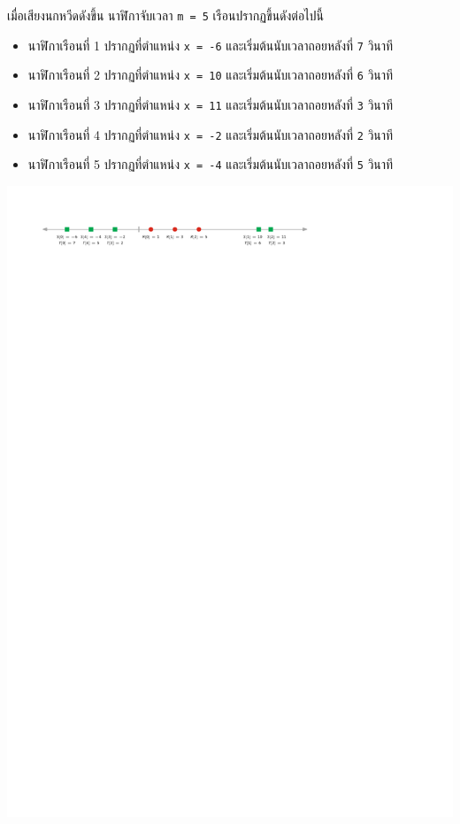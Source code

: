 เมื่อเสียงนกหวีดดังขึ้น นาฬิกาจับเวลา \lstinline{m = 5} เรือนปรากฏขึ้นดังต่อไปนี้
\begin{itemize}[leftmargin=4pc]
    \item  นาฬิกาเรือนที่ 1 ปรากฏที่ตำแหน่ง \lstinline{x = -6} และเริ่มต้นนับเวลาถอยหลังที่ \lstinline{7} วินาที
    \item  นาฬิกาเรือนที่ 2 ปรากฏที่ตำแหน่ง \lstinline{x = 10} และเริ่มต้นนับเวลาถอยหลังที่ \lstinline{6} วินาที
    \item  นาฬิกาเรือนที่ 3 ปรากฏที่ตำแหน่ง \lstinline{x = 11} และเริ่มต้นนับเวลาถอยหลังที่ \lstinline{3} วินาที
    \item  นาฬิกาเรือนที่ 4 ปรากฏที่ตำแหน่ง \lstinline{x = -2} และเริ่มต้นนับเวลาถอยหลังที่ \lstinline{2} วินาที
    \item  นาฬิกาเรือนที่ 5 ปรากฏที่ตำแหน่ง \lstinline{x = -4} และเริ่มต้นนับเวลาถอยหลังที่ \lstinline{5} วินาที
\end{itemize}

\begin{center}
    \bigskip
    \includegraphics[page=1,scale=1.2]{figures/est.pdf}
    \smallskip
\end{center}

